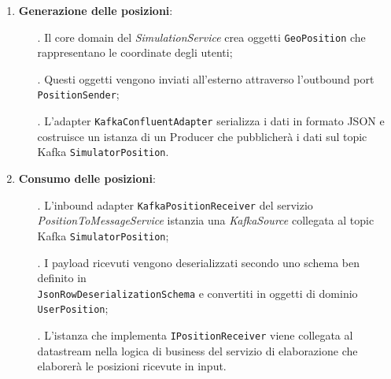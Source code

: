 \documentclass[10pt]{article}
\begin{document}
    \begin{enumerate}
        \item \textbf{Generazione delle posizioni}:
        \begin{itemize}
            \item[.] Il core domain del \textit{SimulationService} crea oggetti \texttt{GeoPosition} che rappresentano le coordinate degli utenti;
            \item[.] Questi oggetti vengono inviati all'esterno attraverso l'outbound port \texttt{PositionSender};
            \item[.] L'adapter \texttt{KafkaConfluentAdapter} serializza i dati in formato JSON e  costruisce un istanza di un Producer che pubblicherà i dati sul topic Kafka \texttt{SimulatorPosition}.
        \end{itemize}

        \item \textbf{Consumo delle posizioni}:
        \begin{itemize}
            \item[.] L'inbound adapter \texttt{KafkaPositionReceiver} del servizio \textit{PositionToMessageService} istanzia una \textit{KafkaSource} collegata al topic Kafka \texttt{SimulatorPosition};
            \item[.] I payload ricevuti vengono deserializzati secondo uno schema ben definito in \\ \texttt{JsonRowDeserializationSchema} e convertiti in oggetti di dominio \texttt{UserPosition};
            \item[.] L'istanza che implementa \texttt{IPositionReceiver} viene collegata al datastream nella logica di business del servizio di elaborazione che elaborerà le posizioni ricevute in input.
        \end{itemize}


\end{enumerate}
\end{document}
